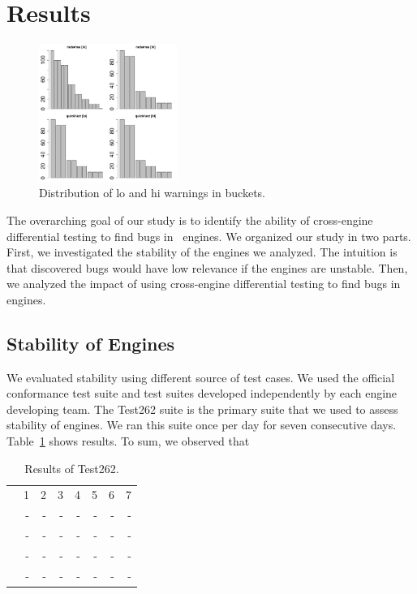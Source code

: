 \documentclass[10pt,conference,anonymous]{IEEEtran}
\begin{document}
\section{Results}
\label{sec:results}

\begin{figure}[t]
  \centering
  \includegraphics[trim=0 0 0 0,clip,width=0.40\textwidth]{R/histograms/histograms.pdf}  
  \caption{\label{fig:distribution}Distribution of lo and hi warnings
   in buckets.}
\end{figure}

The overarching goal of our study is to identify the ability of
cross-engine differential testing to find bugs in \js\ engines. We
organized our study in two parts. First, we investigated the stability
of the engines we analyzed. The intuition is that discovered bugs
would have low relevance if the engines are unstable. Then, we
analyzed the impact of using cross-engine differential testing to find
bugs in \js{} engines.

\subsection{Stability of Engines}

We evaluated stability using different source of test cases. We used
the official \js{} conformance test suite and test suites developed
independently by each engine developing team. The Test262 suite is the
primary suite that we used to assess stability of engines. We ran this
suite once per day for seven consecutive days. Table~\ref{tab:test262}
shows results. To sum, we observed that 

\begin{table}[h]
  \centering
  \caption{\label{tab:test262}Results of Test262.}
  \begin{tabular}{crrrrrrr}
    \toprule
           & 1 & 2 & 3 & 4 & 5 & 6 & 7 \\
    \jsc{} & - & - & - & - & - & - & - \\
    \veight{} & - & - & - & - & - & - & - \\
    \chakra{} & - & - & - & - & - & - & - \\
    \smonkey{} & - & - & - & - & - & - & - \\
    \bottomrule 
  \end{tabular}
\end{table}  
\end{document}

